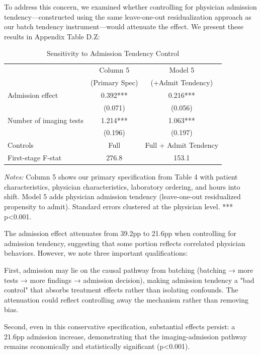 \documentclass[11pt]{article}
\newcommand{\1}{\hbox{\rm 1\kern-.35em 1}}
\begin{document}
To address this concern, we examined whether controlling for physician admission tendency—constructed using the same leave-one-out residualization approach as our batch tendency instrument—would attenuate the effect. We present these results in Appendix Table D.Z:

\begin{table}[h]
\centering
\caption*{Sensitivity to Admission Tendency Control}
\begin{threeparttable}
\begin{tabular}{lcc}
\toprule
& Column 5 & Model 5 \\
& (Primary Spec) & (+Admit Tendency) \\
\midrule
Admission effect & 0.392*** & 0.216*** \\
& (0.071) & (0.056) \\
Number of imaging tests & 1.214*** & 1.063*** \\
& (0.196) & (0.197) \\
\midrule
Controls & Full & Full + Admit Tendency \\
First-stage F-stat & 276.8 & 153.1 \\
\bottomrule
\end{tabular}
\begin{tablenotes}
\footnotesize
\item \textit{Notes:} Column 5 shows our primary specification from Table 4 with patient characteristics, physician characteristics, laboratory ordering, and hours into shift. Model 5 adds physician admission tendency (leave-one-out residualized propensity to admit). Standard errors clustered at the physician level. *** p<0.001.
\end{tablenotes}
\end{threeparttable}
\end{table}

The admission effect attenuates from 39.2pp to 21.6pp when controlling for admission tendency, suggesting that some portion reflects correlated physician behaviors. However, we note three important qualifications:

First, admission may lie on the causal pathway from batching (batching → more tests → more findings → admission decision), making admission tendency a "bad control" that absorbs treatment effects rather than isolating confounds. The attenuation could reflect controlling away the mechanism rather than removing bias.

Second, even in this conservative specification, substantial effects persist: a 21.6pp admission increase, demonstrating that the imaging-admission pathway remains economically and statistically significant (p<0.001).
\end{document}
